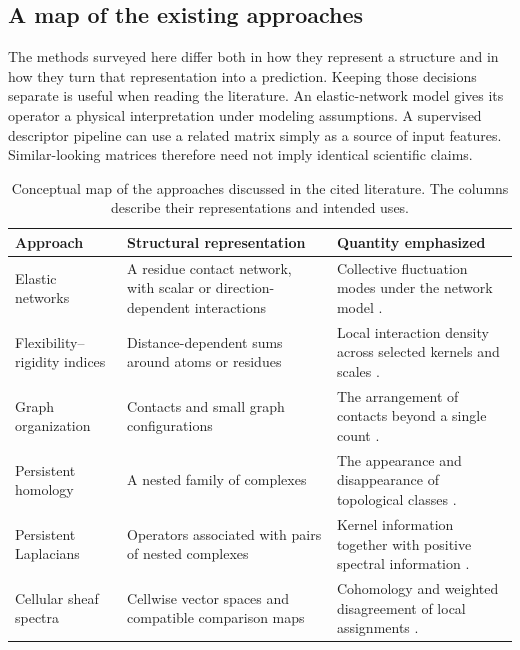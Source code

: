 \subsection{A map of the existing approaches}
The methods surveyed here differ both in how they represent a structure and in how they turn that representation into a prediction. Keeping those decisions separate is useful when reading the literature. An elastic-network model gives its operator a physical interpretation under modeling assumptions. A supervised descriptor pipeline can use a related matrix simply as a source of input features. Similar-looking matrices therefore need not imply identical scientific claims.

\begin{table}[htbp]\centering\small
\caption{Conceptual map of the approaches discussed in the cited literature. The columns describe their representations and intended uses.}
\begin{tabularx}{\linewidth}{>{\raggedright\arraybackslash}p{.23\linewidth}>{\raggedright\arraybackslash}X>{\raggedright\arraybackslash}X}\toprule
Approach & Structural representation & Quantity emphasized\\\midrule
Elastic networks & A residue contact network, with scalar or direction-dependent interactions & Collective fluctuation modes under the network model \citep{haliloglu1997,atilgan2001}.\\
Flexibility--rigidity indices & Distance-dependent sums around atoms or residues & Local interaction density across selected kernels and scales \citep{nguyen2016}.\\
Graph organization & Contacts and small graph configurations & The arrangement of contacts beyond a single count \citep{praznikar2023}.\\
Persistent homology & A nested family of complexes & The appearance and disappearance of topological classes \citep{xia2014}.\\
Persistent Laplacians & Operators associated with pairs of nested complexes & Kernel information together with positive spectral information \citep{wang2020,memoli2022,davies2023}.\\
Cellular sheaf spectra & Cellwise vector spaces and compatible comparison maps & Cohomology and weighted disagreement of local assignments \citep{hansen2019,wei2025}.\\\bottomrule
\end{tabularx}
\end{table}

